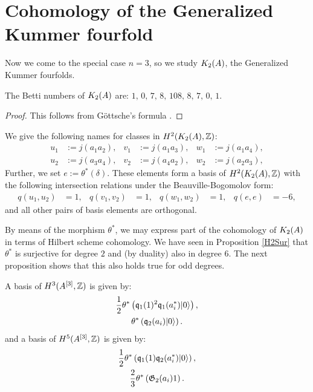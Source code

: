 \section{Cohomology of the Generalized Kummer fourfold}
Now we come to the special case $n=3$, so we study $\kum{A}{2}$, the Generalized Kummer fourfolds.
\begin{proposition}
The Betti numbers of $\kum{A}{2}$ are:
$
1,\,0,\,7,\,8,\,108,\,8,\,7,\,0,\,1.
$
\end{proposition}
\begin{proof}
This follows from G\"ottsche's formula \cite[page 49]{Gottsche}.
\end{proof}


\begin{notation} We give the following names for classes in $H^2(\kum{A}{2},\Z)$:
\begin{align*}
u_1 &:= j(a_1 a_2), & v_1 &:= j(a_1 a_3), & w_1 &:= j(a_1 a_4), \\ 
u_2 &:= j(a_3 a_4), & v_2 &:= j(a_4 a_2), & w_2 &:= j(a_2 a_3),
\end{align*}
Further, we set $e:=\theta^*(\delta)$.
These elements form a basis of $H^2(\kum{A}{2},\Z)$ with the following intersection relations under the Beauville-Bogomolov form:
\begin{align*}
q(u_1,u_2) &= 1, & q(v_1,v_2) &= 1, & q(w_1,w_2) &= 1,  &
q(e,e)&= -6,
\end{align*}
and all other pairs of basis elements are orthogonal.
\end{notation}
By means of the morphism $\theta^*$, we may express part of the cohomology of $\kum{A}{2}$ in terms of Hilbert scheme cohomology. We have seen in Proposition \ref{H2Sur} that $\theta^*$ is surjective for degree $2$ and (by duality) also in degree $6$. 
The next proposition shows that this also holds true for odd degrees.
\begin{proposition}
A basis of $H^3(A\hilb{3},\Z)$ is given by:
\begin{gather}
\label{A3_1}
\frac{1}{2}\theta^*\left( \q_1(1)^2\q_1(a^*_i)\vac \right), \\
\label{A3_2}
\theta^*\left(\q_2(a_i)\vac\right).
\end{gather}
and a basis of $H^5(A\hilb{3},\Z)$ is given by:
\begin{gather}
\label{A5_1}
\frac{1}{2}\theta^*\left( \q_1(1)\q_2(a^*_i)\vac \right), \\
\label{A5_2}
\frac{2}{3} \theta^*\left( \G_2(a_i)1 \right).
\end{gather}
\end{proposition}
